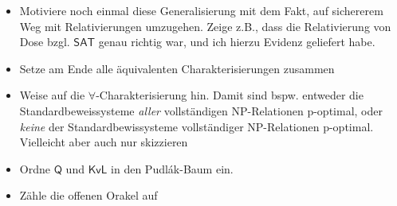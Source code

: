 \documentclass[nofonts]{uebung}
\begin{document}
\begin{enumerate}[label*=\arabic*.]
\begin{enumerate}[label*=\arabic*.]
\begin{itemize}
                \item Motiviere noch einmal diese Generalisierung mit dem Fakt, auf sichererem Weg mit Relativierungen umzugehen. Zeige z.B., dass die Relativierung von Dose bzgl. $\mathsf{SAT}$ genau richtig war, und ich hierzu Evidenz geliefert habe.
                \item Setze am Ende alle äquivalenten Charakterisierungen zusammen
                \item Weise auf die $\forall$-Charakterisierung hin. Damit sind bspw. entweder die Standardbeweissysteme \emph{aller} vollständigen NP-Relationen p-optimal, oder \emph{keine} der Standardbewissysteme vollständiger NP-Relationen p-optimal. Vielleicht aber auch nur skizzieren
                \item Ordne $\mathsf{Q}$ und $\mathsf{KvL}$ in den Pudlák-Baum ein.
                \item Zähle die offenen Orakel auf
            \end{itemize}
        \end{enumerate}
\end{enumerate}
\end{document}
